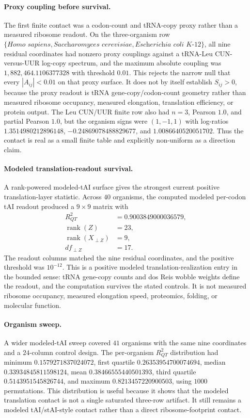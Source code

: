 \paragraph{Proxy coupling before survival.}
The first finite contact was a codon-count and tRNA-copy proxy rather than a measured ribosome readout. On the three-organism row $\{\textit{Homo sapiens},\textit{Saccharomyces cerevisiae},\textit{Escherichia coli K-12}\}$, all nine residual coordinates had nonzero proxy couplings against a tRNA-Leu CUN-versus-UUR log-copy spectrum, and the maximum absolute coupling was $1{,}882{,}464.1106377328$ with threshold $0.01$. This rejects the narrow null that every $|A_{ij}|<0.01$ on that proxy surface. It does not by itself establish $S_{ij}>0$, because the proxy readout is tRNA gene-copy/codon-count geometry rather than measured ribosome occupancy, measured elongation, translation efficiency, or protein output. The Leu CUN/UUR finite row also had $n=3$, Pearson $1.0$, and partial Pearson $1.0$, but the organism signs were $(1,-1,1)$ with log-ratios $1.3514980212896148$, $-0.24869078488829677$, and $1.0086640520051702$. Thus the contact is real as a small finite table and explicitly non-uniform as a direction claim.

\paragraph{Modeled translation-readout survival.}
A rank-powered modeled-tAI surface gives the strongest current positive translation-layer statistic. Across $40$ organisms, the computed modeled per-codon tAI readout produced a $9\times 9$ matrix with
$$
\begin{aligned}
R^2_{QT} &= 0.9003849000036579,\\
\operatorname{rank}(Z) &= 23,\\
\operatorname{rank}(X_{\perp Z}) &= 9,\\
df_{\perp Z} &= 17.
\end{aligned}
$$
The readout columns matched the nine residual coordinates, and the positive threshold was $10^{-12}$. This is a positive modeled translation-realization entry in the bounded sense: tRNA gene-copy counts and dos Reis wobble weights define the readout, and the computation survives the stated controls. It is not measured ribosome occupancy, measured elongation speed, proteomics, folding, or molecular function.

\paragraph{Organism sweep.}
A wider modeled-tAI sweep covered $41$ organisms with the same nine coordinates and a $24$-column control design. The per-organism $R^2_{QT}$ distribution had minimum $0.1579271837024072$, first quartile $0.26353954700074694$, median $0.33934845811598124$, mean $0.38466555440501393$, third quartile $0.5143951545826744$, and maximum $0.8213457220900503$, using $1000$ permutations. This distribution is useful because it shows that the modeled translation contact is not a single saturated three-row artifact. It still remains a modeled tAI/stAI-style contact rather than a direct ribosome-footprint contact.

